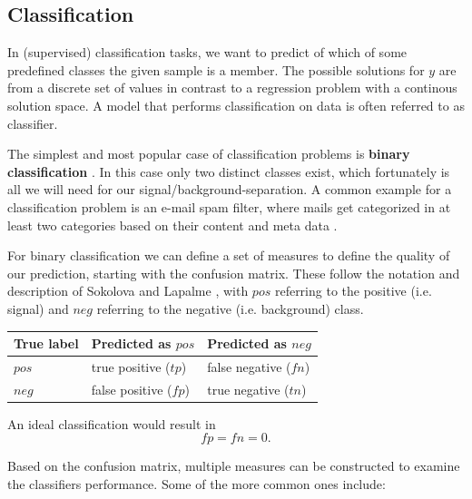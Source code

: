 \subsection{Classification}
In (supervised) classification tasks, we want to predict of which of some 
predefined classes the given sample is a member. The possible solutions for $y$
are from a discrete set of values in 
contrast to a regression problem with a continous solution space.
A model that performs classification on data is often referred to as
classifier.

The simplest and most popular case of classification problems
is \textbf{binary classification} \cite{sokolova2009systematic}.
In this case only two distinct
classes exist, which fortunately is all we will need for
our signal/background-separation.
A common example for a classification problem is an e-mail spam filter,
where mails get categorized in at least two categories based
on their content and meta data \cite{DBLP:journals/corr/cs-CL-0006013}.

For binary classification we can define a set of measures
to define the quality of our prediction, starting with the confusion matrix.
These follow the notation and description of
Sokolova and Lapalme \cite{sokolova2009systematic},
with $pos$ referring to the positive (i.e. signal)
and $neg$ referring to the negative (i.e. background) class.

\begin{center}
    \begin{tabular}{ | l | l | l |}
    \hline
    True label & Predicted as $pos$ & Predicted as $neg$ \\
    \hline
    $pos$ & true positive ($tp$) & false negative ($fn$) \\ 
    \hline
    $neg$ & false positive ($fp$) & true negative ($tn$) \\
    \hline
    \end{tabular}
    \label{tab:confusion}
\end{center}

An ideal classification would result in
\begin{equation*}
  fp = fn = 0.
\end{equation*}

Based on the confusion matrix, multiple measures 
can be constructed to examine the classifiers performance.
Some of the more common ones include:

